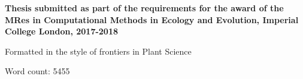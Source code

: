 \vspace{1cm}

\begin{center}
\large{\bf{Thesis submitted as part of the requirements for the award of the 
MRes in Computational Methods in Ecology and Evolution, Imperial College London, 2017-2018}} 
\vspace{0.5cm}
\large{\bf{

Formatted in the style of frontiers in Plant Science}}
\vspace{0.5cm}
\large{\bf{

Word count: 5455}}

\end{center}


\vspace{2cm}

